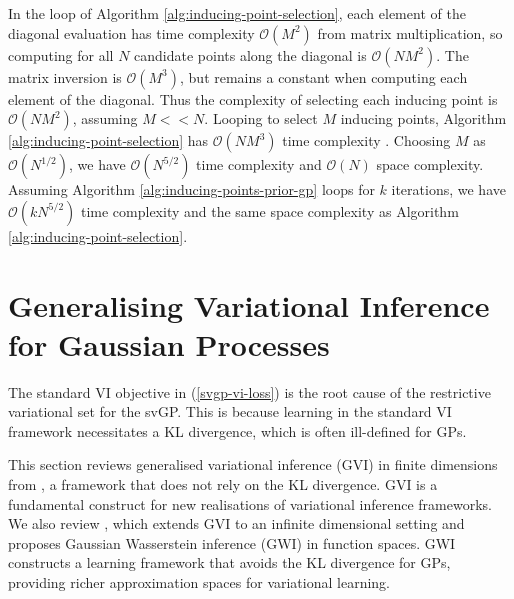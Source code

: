 \documentclass{article}
\numberwithin{equation}{section}
\begin{document}
In the loop of Algorithm \ref{alg:inducing-point-selection}, each element of the diagonal evaluation has time complexity  $\mathcal{O}(M^2)$ from matrix multiplication, so computing for all $N$ candidate points along the diagonal is $\mathcal{O}(NM^2)$.
The matrix inversion is $\mathcal{O}(M^3)$, but remains a constant when computing each element of the diagonal.
Thus the complexity of selecting each inducing point is $\mathcal{O}(NM^2)$, assuming $M << N$.
Looping to select $M$ inducing points, Algorithm \ref{alg:inducing-point-selection} has $\mathcal{O}(NM^3)$ time complexity .
Choosing $M$ as $\mathcal{O}(N^{1/2})$, we have $\mathcal{O}(N^{5/2})$ time complexity  and $\mathcal{O}(N)$ space complexity. 
Assuming Algorithm \ref{alg:inducing-points-prior-gp} loops for $k$ iterations, we have $\mathcal{O}(k N^{5/2})$ time complexity and the same space complexity as Algorithm \ref{alg:inducing-point-selection}.



\newpage
\section{Generalising Variational Inference for Gaussian Processes}\label{section:gvi-for-gps}
The standard VI objective in (\ref{svgp-vi-loss}) is the root cause of the restrictive variational set for the svGP. 
This is because learning in the standard VI framework necessitates a KL divergence, which is often ill-defined for GPs.

This section reviews generalised variational inference (GVI) in finite dimensions from \cite{knoblauch2022optimization}, a framework that does not rely on the KL divergence.
GVI is a fundamental construct for new realisations of variational inference frameworks.
We also review \cite{wild2022generalized}, which extends GVI to an infinite dimensional setting and proposes Gaussian Wasserstein inference (GWI) in function spaces.
GWI constructs a learning framework that avoids the KL divergence for GPs, providing richer approximation spaces for variational learning.
\end{document}

